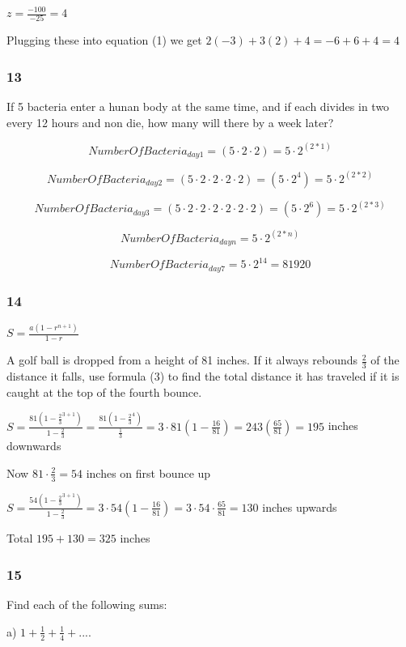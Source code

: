 \documentclass[]{report}
\begin{document}
$z = \frac{-100}{-25} = 4$


Plugging these into equation (1) we get
$2(-3) + 3(2) + 4 = -6 + 6 + 4 = 4$


\subsubsection{13}

If 5 bacteria enter a hunan body at the same time, and if each divides in two every 12 hours and non die, how many will there by a week later?

\[
NumberOfBacteria_{day1} = (5\cdot 2 \cdot 2) = 5 \cdot 2^{(2*1)}
\]

\[
NumberOfBacteria_{day2} = (5 \cdot 2 \cdot 2 \cdot 2 \cdot 2) = (5 \cdot 2^4) = 5 \cdot 2^{(2*2)}
\]

\[
NumberOfBacteria_{day3} = (5 \cdot 2 \cdot 2 \cdot 2 \cdot 2 \cdot 2 \cdot 2) = (5 \cdot 2^6)= 5 \cdot 2^{(2*3)}
\]

\[
NumberOfBacteria_{day n} = 5 \cdot 2^{(2*n)}
\]

\[
NumberOfBacteria_{day 7} = 5 \cdot 2^{14} = 81920
\]

\subsubsection{14}

$S = \frac{a(1 - r^{n+1})}{1-r}$

A golf ball is dropped from a height of 81 inches. If it always rebounds $\frac{2}{3}$ of the distance it falls, use formula (3) to find the total distance it has traveled if it is caught at the top of the fourth bounce.


$S = \frac{81(1 - \frac{2}{3}^{3+1})}{1-\frac{2}{3}} = \frac{81(1 - \frac{2}{3}^4)}{\frac{1}{3}} = 3 \cdot 81(1 - \frac{16}{81}) = 243 (\frac{65}{81}) = 195 $ inches downwards

Now $81 \cdot \frac{2}{3} = 54$ inches on first bounce up


$S = \frac{54(1 - \frac{2}{3}^{3+1})}{1-\frac{2}{3}} = 3 \cdot 54 (1 - \frac{16}{81})  = 3 \cdot 54 \cdot \frac{65}{81} = 130$ inches upwards

Total $195 + 130 =  325 $ inches

\subsubsection{15}
Find each of the following sums:

a) $1 + \frac{1}{2} + \frac{1}{4} + ....$
\end{document}
